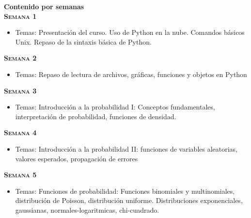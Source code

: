 \documentclass[letterpaper,10pt,onecolumn]{article}
\begin{document}
\newpage
{}
\noindent\textbf{\large {} \quad Contenido por
  semanas}\\[-0.2cm]  


\noindent\textbf{\textsc{Semana 1}}\\[-0.5cm]
\begin{itemize}
\item Temas: 
Presentaci\'on del curso. Uso de Python en la nube. Comandos b\'asicos Unix. 
Repaso de la sintaxis b\'asica de Python. \\[-0.6cm] 
\end{itemize}


\noindent\textbf{\textsc{Semana 2}} \\[-0.5cm]
\begin{itemize}
\item Temas: 
Repaso de lectura de archivos, gr\'aficas, funciones y objetos en Python \\[-0.6cm] 
\end{itemize}

\noindent\textbf{\textsc{Semana 3}}\\[-0.5cm]
\begin{itemize}
\item Temas:  Introducci\'on a la probabilidad I: Conceptos
  fundamentales, interpretaci\'on de probabilidad, funciones de
  densidad. \\[-0.6cm] 
\end{itemize}

\noindent\textbf{\textsc{Semana 4}}\\[-0.5cm]
\begin{itemize}
\item Temas:  Introducci\'on a la probabilidad II: funciones de
  variables aleatorias, valores esperados, propagaci\'on de errores
  \\[-0.6cm] 
\end{itemize}

\noindent\textbf{\textsc{Semana 5}}\\[-0.5cm]
\begin{itemize}
\item Temas: Funciones de probabilidad: Funciones binomiales y
  multinomiales, distribuci\'on de Poisson, distribuci\'on
  uniforme. Distribuciones exponenciales, gaussianas,
  normales-logaritmicas, chi-cuadrado. \\[-0.6cm] 
\end{itemize}
\end{document}
